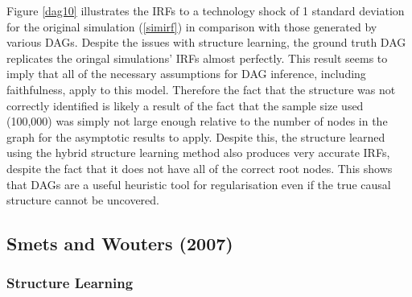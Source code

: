\documentclass{article}
\begin{document}
Figure \ref{dag10} illustrates the IRFs to a technology shock of 1 standard deviation for the original simulation (\ref{simirf}) in comparison with those generated by various DAGs. Despite the issues with structure learning, the ground truth DAG replicates the oringal simulations' IRFs almost perfectly. This result seems to imply that all of the necessary assumptions for DAG inference, including faithfulness, apply to this model. Therefore the fact that the structure was not correctly identified is likely a result of the fact that the sample size used (100,000) was simply not large enough relative to the number of nodes in the graph for the asymptotic results to apply. Despite this, the structure learned using the hybrid structure learning method also produces very accurate IRFs, despite the fact that it does not have all of the correct root nodes. This shows that DAGs are a useful heuristic tool for regularisation even if the true causal structure cannot be uncovered.

\subsection{Smets and Wouters (2007)}

\subsubsection{Structure Learning}
\end{document}
